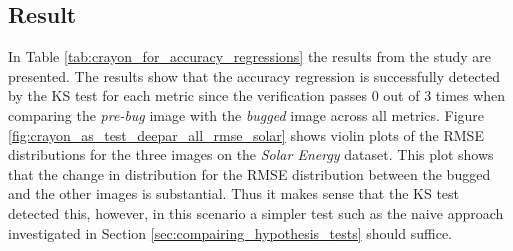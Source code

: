 \subsection{Result}
In Table \ref{tab:crayon_for_accuracy_regressions} the results from the study are presented. The results show that the accuracy regression is successfully detected by the KS test for each metric since the verification passes 0 out of 3 times when comparing the \textit{pre-bug} image with the \textit{bugged} image across all metrics. Figure \ref{fig:crayon_as_test_deepar_all_rmse_solar} shows violin plots of the RMSE distributions for the three images on the \textit{Solar Energy} dataset. This plot shows that the change in distribution for the RMSE distribution between the bugged and the other images is substantial. Thus it makes sense that the KS test detected this, however, in this scenario a simpler test such as the naive approach investigated in Section \ref{sec:compairing_hypothesis_tests} should suffice.


